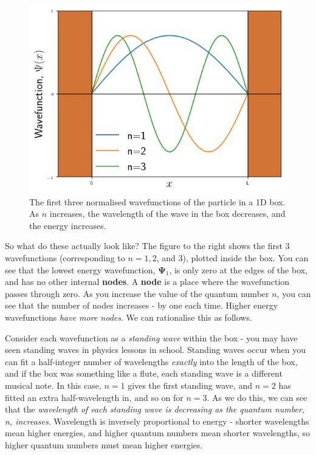 \documentclass{memoir}[11pt,oneside,a4paper,openany]
\newcommand{\wf}{\ensuremath{\bm{\Psi}}\xspace}
\begin{document}
\begin{figure}
	\includegraphics[width=\linewidth]{particle_in_box_wf.png}
	\caption{The first three normalised wavefunctions of the particle in a 1D box. As $n$ increases, the wavelength of the wave in the box decreases, and the energy increases.}
\end{figure}
So what do these actually look like? The figure to the right shows the first 3 wavefunctions (corresponding to $n=1,2$, and $3$), plotted inside the box. You can see that the lowest energy wavefunction, \wf$_1$, is only zero at the edges of the box, and has no other internal \textbf{nodes}. A \textbf{node} is a place where the wavefunction passes through zero. As you increase the value of the quantum number $n$, you can see that the number of nodes increases - by one each time. Higher energy wavefunctions \emph{have more nodes}. We can rationalise this as follows.

Consider each wavefunction as a \emph{standing wave} within the box - you may have seen standing waves in physics lessons in school. Standing waves occur when you can fit a half-integer number of wavelengths \emph{exactly} into the length of the box, and if the box was something like a flute, each standing wave is a different musical note. In this case, $n=1$ gives the first standing wave, and $n=2$ has fitted an extra half-wavelength in, and so on for $n=3$. As we do this, we can see that the \emph{wavelength of each standing wave is decreasing as the quantum number, n, increases}. Wavelength is inversely proportional to energy - shorter wavelengths mean higher energies, and higher quantum numbers mean shorter wavelengths, so higher quantum numbers must mean higher energies. 
\end{document}
